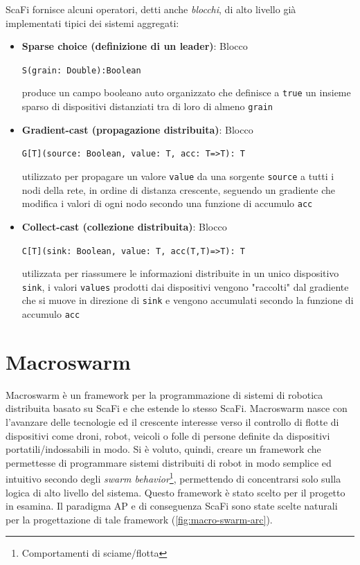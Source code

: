 \documentclass[12pt,a4paper,openright,twoside]{book}
\begin{document}
ScaFi fornisce alcuni operatori, detti anche \textit{blocchi}, di alto livello già implementati tipici dei sistemi aggregati:

\begin{itemize}
    \item \textbf{Sparse choice (definizione di un leader)}: Blocco 
    \begin{center}
        \verb|S(grain: Double):Boolean|
    \end{center}
    produce un campo booleano auto organizzato che definisce a \verb|true| un insieme sparso di dispositivi distanziati tra di loro di almeno \verb|grain|
    \item \textbf{Gradient-cast (propagazione distribuita)}: Blocco 
    \begin{center}
        \verb|G[T](source: Boolean, value: T, acc: T=>T): T|
    \end{center}
    utilizzato per propagare un valore \verb|value| da una sorgente \verb|source| a tutti i nodi della rete, in ordine di distanza crescente, seguendo un gradiente che modifica i valori di ogni nodo secondo una funzione di accumulo \verb|acc|
    \item \textbf{Collect-cast (collezione distribuita)}: Blocco 
    \begin{center}
        \verb|C[T](sink: Boolean, value: T, acc(T,T)=>T): T| 
    \end{center}
    utilizzata per riassumere le informazioni distribuite in un unico dispositivo \verb|sink|, i valori \verb|values| prodotti dai dispositivi vengono "raccolti" dal gradiente che si muove in direzione di \verb|sink| e vengono accumulati secondo la funzione di accumulo \verb|acc|
\end{itemize}

\section{Macroswarm}

Macroswarm è un framework per la programmazione di sistemi di robotica distribuita basato su ScaFi e che estende lo stesso ScaFi. Macroswarm nasce con l'avanzare delle tecnologie ed il crescente interesse verso il controllo di flotte di dispositivi come droni, robot, veicoli o folle di persone definite da dispositivi portatili/indossabili in modo.
Si è voluto, quindi, creare un framework che permettesse di programmare sistemi distribuiti di robot in modo semplice ed intuitivo secondo degli \textit{swarm behavior}\footnote{Comportamenti di sciame/flotta}, permettendo di concentrarsi solo sulla logica di alto livello del sistema. Questo framework è stato scelto per il progetto in esamina.
Il paradigma \ac{AP} e di conseguenza ScaFi sono state scelte naturali per la progettazione di tale framework (\cref{fig:macro-swarm-arc}).
\end{document}
